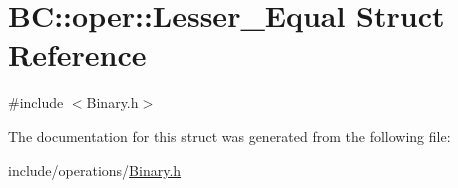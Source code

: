 \hypertarget{structBC_1_1oper_1_1Lesser__Equal}{}\section{BC\+:\+:oper\+:\+:Lesser\+\_\+\+Equal Struct Reference}
\label{structBC_1_1oper_1_1Lesser__Equal}


{\ttfamily \#include $<$Binary.\+h$>$}



The documentation for this struct was generated from the following file\+:\begin{DoxyCompactItemize}
\item 
include/operations/\hyperlink{Binary_8h}{Binary.\+h}\end{DoxyCompactItemize}
